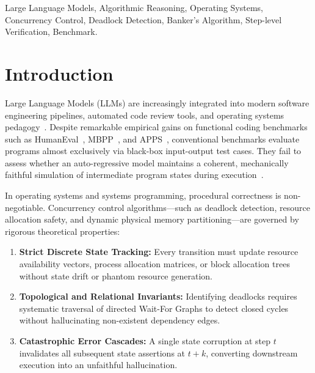\documentclass[conference]{IEEEtran}
\begin{document}
\begin{IEEEkeywords}
Large Language Models, Algorithmic Reasoning, Operating Systems, Concurrency Control,
Deadlock Detection, Banker's Algorithm, Step-level Verification, Benchmark.
\end{IEEEkeywords}

\section{Introduction}
\label{sec:intro}

Large Language Models (LLMs) are increasingly integrated into modern software engineering
pipelines, automated code review tools, and operating systems pedagogy~\cite{brown2020language,bubeck2023sparks}.
Despite remarkable empirical gains on functional coding benchmarks such as
HumanEval~\cite{chen2021codex}, MBPP~\cite{austin2021program}, and
APPS~\cite{hendrycks2021apps}, conventional benchmarks evaluate programs almost
exclusively via black-box input-output test cases. They fail to assess whether an
auto-regressive model maintains a coherent, mechanically faithful simulation of
intermediate program states during execution~\cite{cobbe2021training,hendrycks2021math,lightman2024verify}.

In operating systems and systems programming, procedural correctness is
non-negotiable. Concurrency control algorithms---such as deadlock detection, resource
allocation safety, and dynamic physical memory partitioning---are governed by rigorous
theoretical properties:
\begin{enumerate}
\item \textbf{Strict Discrete State Tracking:} Every transition must update resource
  availability vectors, process allocation matrices, or block allocation trees without
  state drift or phantom resource generation.
\item \textbf{Topological and Relational Invariants:} Identifying deadlocks requires
  systematic traversal of directed Wait-For Graphs to detect closed cycles without
  hallucinating non-existent dependency edges.
\item \textbf{Catastrophic Error Cascades:} A single state corruption at step $t$
  invalidates all subsequent state assertions at $t{+}k$, converting downstream
  execution into an unfaithful hallucination.
\end{enumerate}
\end{document}
